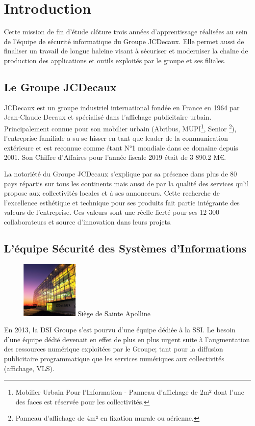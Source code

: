 \chapter{Introduction}
Cette mission de fin d'étude clôture trois années d'apprentissage réalisées au sein de l'équipe de sécurité informatique 
du Groupe JCDecaux. Elle permet aussi de finaliser un travail de longue haleine visant à sécuriser et moderniser
la chaîne de production des applications et outils exploités par le groupe et ses filiales.

\section{Le Groupe JCDecaux}
JCDecaux est un groupe industriel international fondée en France en 1964 par Jean-Claude Decaux et spécialisé dans 
l'affichage publicitaire urbain. Principalement connue pour son mobilier urbain (Abribus, MUPI\footnote{Mobilier Urbain 
Pour l'Information - Panneau d'affichage de 2m² dont l'une des faces est réservée pour les collectivités.}, Senior
\footnote{Panneau d'affichage de 4m² en fixation murale ou aérienne.}), l'entreprise familiale a su se hisser en tant 
que leader de la communication extérieure et est reconnue comme étant N°1 mondiale dans ce domaine depuis 2001. 
\newline Son Chiffre d'Affaires pour l'année fiscale 2019 était de 3 890.2 M€.

La notoriété du Groupe JCDecaux s'explique par sa présence dans plus de 80 pays répartis sur tous les continents mais
aussi de par la qualité des services qu'il propose aux collectivités locales et à ses annonceurs.
\newline Cette recherche de l'excellence esthétique et technique pour ses produits fait partie intégrante des 
valeurs de l'entreprise. Ces valeurs sont une réelle fierté pour ses 12 300 collaborateurs et source d'innovation dans leurs
projets. 

\section{L'équipe Sécurité des Systèmes d'Informations}
\begin{figure} 
    \centering \includegraphics[width=0.25\textwidth]{resources/img/jcd_pla_front.jpg}
    \centering Siège de Sainte Apolline
\end{figure}
En 2013, la \ac{DSI} Groupe s'est pourvu d'une équipe dédiée à la \ac{SSI}.
Le besoin d'une équipe dédié devenait en effet de plus en plus urgent suite à l'augmentation des ressources numérique
exploitées par le Groupe; tant pour la diffusion publicitaire programmatique que les services numériques aux 
collectivités (affichage, VLS).

